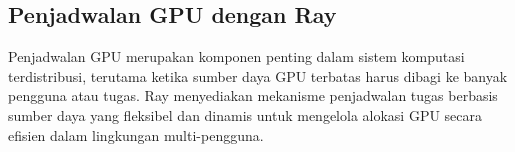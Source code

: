 



\newpage



\newpage

\subsection{Penjadwalan GPU dengan Ray}

Penjadwalan GPU merupakan komponen penting dalam sistem komputasi terdistribusi, terutama ketika sumber daya GPU terbatas harus dibagi ke banyak pengguna atau tugas. Ray menyediakan mekanisme penjadwalan tugas berbasis sumber daya yang fleksibel dan dinamis untuk mengelola alokasi GPU secara efisien dalam lingkungan multi-pengguna.

